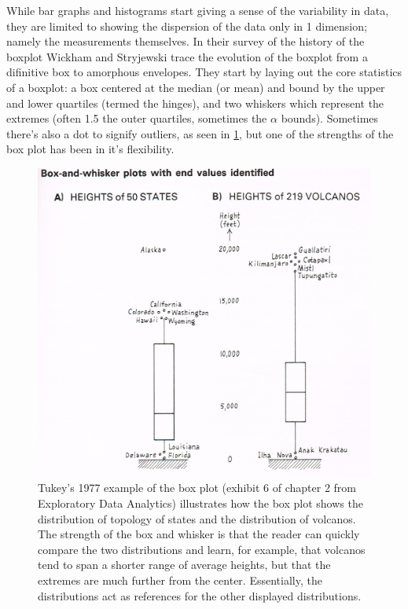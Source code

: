 While bar graphs and histograms start giving a sense of the variability in
data, they are limited to showing the dispersion of the data only in 1
dimension; namely the measurements themselves. In their survey of the history
of the boxplot \cite{wickham2011} Wickham and Stryjewski trace the evolution of
the boxplot from a difinitive box to amorphous envelopes.  They start by laying out
the core statistics of a boxplot: a box centered at the median (or mean) and
bound by the upper and lower quartiles (termed the hinges), and two whiskers which represent the
extremes (often 1.5 the outer quartiles, sometimes the $\alpha$ bounds). Sometimes there's
also a dot to signify outliers, as seen in \ref{fig:boxplot}, but one of
the strengths of the box plot has been in it's flexibility. 

\begin{figure}
\includegraphics{figs/boxplot.png}
\caption{Tukey's 1977 example of the box plot (exhibit 6 of chapter 2 from
Exploratory Data Analytics\cite{tukey1977}) illustrates how the box plot shows
the distribution of topology of states and
the distribution of volcanos. The strength of the box and whisker is that the
reader can quickly compare the two distributions and learn, for example, that
volcanos tend to span a shorter range of average heights, but that the extremes
are much further from the center. Essentially, the distributions act as
references for the other displayed distributions.}
\label{fig:boxplot}
\end{figure}

